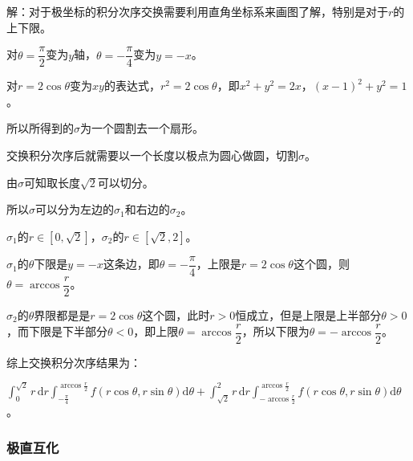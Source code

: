 解：对于极坐标的积分次序交换需要利用直角坐标系来画图了解，特别是对于$r$的上下限。

对$\theta=\dfrac{\pi}{2}$变为$y$轴，$\theta=-\dfrac{\pi}{4}$变为$y=-x$。

对$r=2\cos\theta$变为$xy$的表达式，$r^2=2\cos\theta$，即$x^2+y^2=2x$，$(x-1)^2+y^2=1$。

所以所得到的$\sigma$为一个圆割去一个扇形。

\begin{minipage}{0.625\linewidth}
    
    交换积分次序后就需要以一个长度以极点为圆心做圆，切割$\sigma$。

    由$\sigma$可知取长度$\sqrt{2}$可以切分。

    所以$\sigma$可以分为左边的$\sigma_1$和右边的$\sigma_2$。
\end{minipage}
\hfill
\begin{minipage}{0.25\linewidth}
\end{minipage}

$\sigma_1$的$r\in[0,\sqrt{2}]$，$\sigma_2$的$r\in[\sqrt{2},2]$。

$\sigma_1$的$\theta$下限是$y=-x$这条边，即$\theta=-\dfrac{\pi}{4}$，上限是$r=2\cos\theta$这个圆，则$\theta=\arccos\dfrac{r}{2}$。

$\sigma_2$的$\theta$界限都是是$r=2\cos\theta$这个圆，此时$r>0$恒成立，但是上限是上半部分$\theta>0$，而下限是下半部分$\theta<0$，即上限$\theta=\arccos\dfrac{r}{2}$，所以下限为$\theta=-\arccos\dfrac{r}{2}$。

综上交换积分次序结果为：

$\int_0^{\sqrt{2}}r\,\textrm{d}r\int_{-\frac{\pi}{4}}^{\arccos\frac{r}{2}}f(r\cos\theta,r\sin\theta)\textrm{d}\theta+\int_{\sqrt{2}}^2r\,\textrm{d}r\int_{-\arccos\frac{r}{2}}^{\arccos\frac{r}{2}}f(r\cos\theta,r\sin\theta)\textrm{d}\theta$。

\subsubsection{极直互化}

